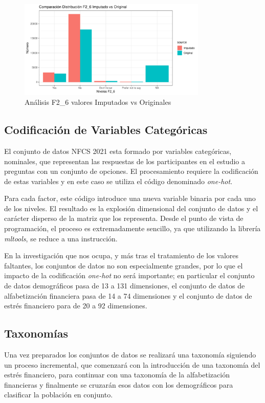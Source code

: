 \documentclass[a4paper, 11pt]{article}
\begin{document}
\begin{figure}[ht]
    \centering
    \includegraphics[width=0.8\textwidth]{images/Analysis_MV_F2_6.pdf} 
    \caption{Análisis F2\_6 valores Imputados vs Originales}
    \label{fig:Analysis_MV_F2_6}
\end{figure}

\subsection{Codificación de Variables Categóricas}
El conjunto de datos NFCS 2021 esta formado por variables categóricas, nominales, que
representan las respuestas de los participantes en el estudio a preguntas con un
conjunto de opciones. El procesamiento requiere la codificación de estas variables
y en este caso se utiliza el código denominado \textit{one-hot}. 

Para cada factor, este código introduce una nueva variable binaria por cada uno de los
niveles. El resultado es la explosión dimensional del conjunto de datos y el carácter
disperso de la matriz que los representa. Desde el punto de vista de programación, 
el proceso es extremadamente sencillo, ya que utilizando la librería \textit{mltools}, se
reduce a una instrucción.

En la investigación que nos ocupa, y más tras el tratamiento de los valores faltantes, los
conjuntos de datos no son especialmente grandes, por lo que el impacto de la codificación
\textit{one-hot} no será importante; en particular el conjunto de datos demográficos pasa
de 13 a 131 dimensiones, el conjunto de datos de alfabetización financiera pasa de 14 a 74
dimensiones y el conjunto de datos de estrés financiero para de 20 a 92 dimensiones.

\subsection{Taxonomías}
\label{sec:sub:clustering}
Una vez preparados los conjuntos de datos se realizará una taxonomía siguiendo un proceso
incremental, que comenzará con la introducción de una taxonomía del estrés financiero, para
continuar con una taxonomía de la alfabetización financieras y finalmente
se cruzarán esos datos con los demográficos para clasificar la población en conjunto.
\end{document}
